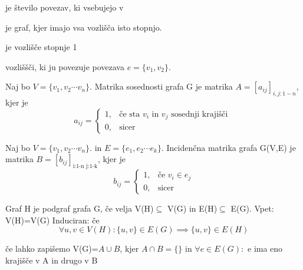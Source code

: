 \begin{slajd}
    {}{je število povezav, ki vsebujejo v}
\end{slajd}


\begin{slajd}
    {}{je graf, kjer imajo vsa vozlišča isto stopnjo.}
\end{slajd}


\begin{slajd}
    {}{je vozlišče stopnje 1}
\end{slajd}

\begin{slajd}
    {}{vozliššči, ki ju povezuje povezava $e=\{v_1,v_2\}$.}
\end{slajd}


\begin{slajd}
    {}{Naj bo $V=\{v_1,v_2 \cdots v_n \}.$ Matrika sosednosti grafa G je matrika $A=[a_{ij}]_{i,j:1-n}$, kjer je \break \[
    a_{ij} = \begin{cases}
        1,& \text{če sta $v_i$ in $v_j$ sosednji krajišči }\\
        0,& \text{sicer}
    \end{cases}
    \]}
\end{slajd}

\begin{slajd}
    {}{Naj bo $V=\{v_1,v_2 \cdots v_n \}.$ in $E=\{e_1,e_2 \cdots e_k \}.$ Incidenčna matrika grafa G(V,E) je matrika $B=[b_{ij}]_{\text{i:1-n j:1-k}}$, kjer je \break \[
    b_{ij} = \begin{cases}
        1,& \text{če $v_i \in e_j$}\\
        0,& \text{sicer}
    \end{cases}
    \]}
\end{slajd}

\begin{slajd}
    {}{Graf H je podgraf grafa G, če velja V(H)$\subseteq$ V(G) in E(H)$\subseteq$ E(G). \break Vpet: V(H)=V(G) \break
    Induciran: če \[ \forall u,v \in V(H): \{u,v\}\in E(G) \implies \{u,v\}\in E(H) \] }
\end{slajd}

\begin{slajd}
    {}{če lahko zapišemo V(G)=$A \cup B$, kjer $A\cap B =\{\}$ in $\forall e \in E(G):$ e ima eno krajišče v A in drugo v B }
\end{slajd}

